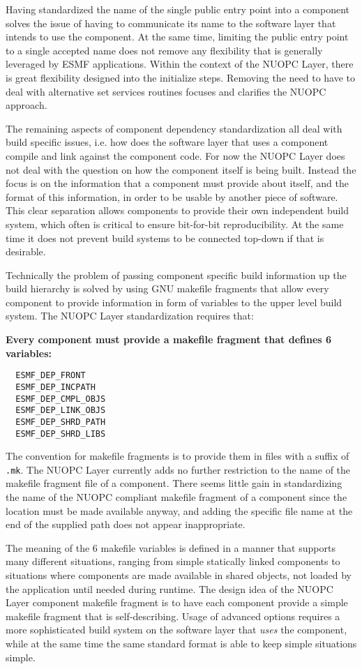 Having standardized the name of the single public entry point into a component solves the issue of having to communicate its name to the software layer that intends to use the component. At the same time, limiting the public entry point to a single accepted name does not remove any flexibility that is generally leveraged by ESMF applications. Within the context of the NUOPC Layer, there is great flexibility designed into the initialize steps. Removing the need to have to deal with alternative set services routines focuses and clarifies the NUOPC approach.

The remaining aspects of component dependency standardization all deal with build specific issues, i.e. how does the software layer that uses a component compile and link against the component code. For now the NUOPC Layer does not deal with the question on how the component itself is being built. Instead the focus is on the information that a component must provide about itself, and the format of this information, in order to be usable by another piece of software. This clear separation allows components to provide their own independent build system, which often is critical to ensure bit-for-bit reproducibility. At the same time it does not prevent build systems to be connected top-down if that is desirable.

Technically the problem of passing component specific build information up the build hierarchy is solved by using GNU makefile fragments that allow every component to provide information in form of variables to the upper level build system. The NUOPC Layer standardization requires that: {\bf Every component must provide a makefile fragment that defines 6 variables:
\begin{verbatim}
  ESMF_DEP_FRONT     
  ESMF_DEP_INCPATH   
  ESMF_DEP_CMPL_OBJS 
  ESMF_DEP_LINK_OBJS 
  ESMF_DEP_SHRD_PATH 
  ESMF_DEP_SHRD_LIBS 
\end{verbatim}
}
The convention for makefile fragments is to provide them in files with a suffix of {\tt .mk}.  The NUOPC Layer currently adds no further restriction to the name of the makefile fragment file of a component. There seems little gain in standardizing the name of the NUOPC compliant makefile fragment of a component since the location must be made available anyway, and adding the specific file name at the end of the supplied path does not appear inappropriate.

The meaning of the 6 makefile variables is defined in a manner that supports many different situations, ranging from simple statically linked components to situations where components are made available in shared objects, not loaded by the application until needed during runtime. The design idea of the NUOPC Layer component makefile fragment is to have each component provide a simple makefile fragment that is self-describing. Usage of advanced options requires a more sophisticated build system on the software layer that {\em uses} the component, while at the same time the same standard format is able to keep simple situations simple.

